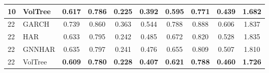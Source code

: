 \documentclass[runningheads]{llncs}
\begin{document}
\begin{table}[t]
\begin{tabular}{ll cccc cccc}
10 & VolTree & \textbf{0.617} & \textbf{0.786} & \textbf{0.225} & \textbf{0.392} & \textbf{0.595} & \textbf{0.771} & \textbf{0.439} & \textbf{1.682} \\
\midrule
22 & GARCH    & 0.739 & 0.860 & 0.363 & 0.544 & 0.788 & 0.888 & 0.606 & 1.837 \\
22 & HAR      & 0.633 & 0.795 & 0.242 & 0.485 & 0.672 & 0.820 & 0.528 & 1.835 \\
22 & GNNHAR   & 0.635 & 0.797 & 0.241 & 0.476 & 0.655 & 0.809 & 0.507 & 1.810 \\
22 & VolTree & \textbf{0.609} & \textbf{0.780} & \textbf{0.228} & \textbf{0.407} & \textbf{0.621} & \textbf{0.788} & \textbf{0.460} & \textbf{1.726} \\
\bottomrule
\end{tabular}
\end{table}
\end{document}
